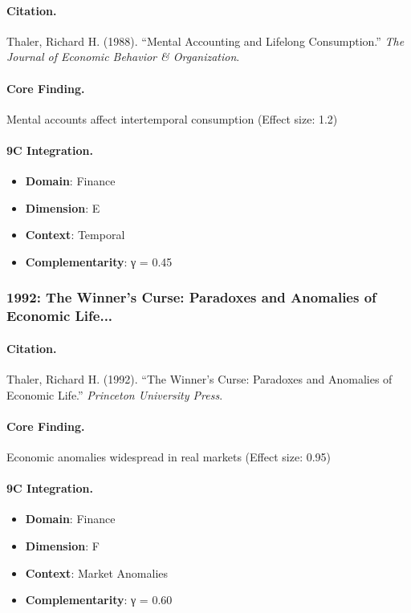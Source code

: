 \paragraph{Citation.}
Thaler, Richard H. (1988). ``Mental Accounting and Lifelong Consumption.''
\textit{The Journal of Economic Behavior & Organization}.

\paragraph{Core Finding.}
Mental accounts affect intertemporal consumption (Effect size: 1.2)

\paragraph{9C Integration.}
\begin{itemize}[nosep]
  \item \textbf{Domain}: Finance
  \item \textbf{Dimension}: E
  \item \textbf{Context}: Temporal
  \item \textbf{Complementarity}: γ = 0.45
\end{itemize}

\subsubsection{1992: The Winner's Curse: Paradoxes and Anomalies of Economic Life...}

\paragraph{Citation.}
Thaler, Richard H. (1992). ``The Winner's Curse: Paradoxes and Anomalies of Economic Life.''
\textit{Princeton University Press}.

\paragraph{Core Finding.}
Economic anomalies widespread in real markets (Effect size: 0.95)

\paragraph{9C Integration.}
\begin{itemize}[nosep]
  \item \textbf{Domain}: Finance
  \item \textbf{Dimension}: F
  \item \textbf{Context}: Market Anomalies
  \item \textbf{Complementarity}: γ = 0.60
\end{itemize}

